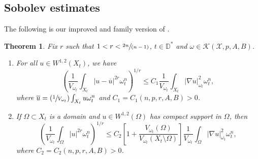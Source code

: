 \documentclass[JEP,XML,SOM,Unicode,published]{cedram}
\newcommand{\Psfrac}[2]{(\sfrac{#1}{#2})}
\newcommand{\spfrac}[2]{\sfrac{#1}{(#2)}}
\newtheorem{theorem}{Theorem}[section]
\theoremstyle{definition}
\newcommand{\D}{\mathbb D}
\begin{document}
\subsection{Sobolev estimates} \label{sec:sobolev}

The following is our improved and family version of \cite[Th.\,2.1 \& Lem.\,6.2]{GPSS23}.

\begin{theorem} \label{thm:sobolev}
Fix $r$ such that $1<r< \spfrac{2n}{n-1}$, $t \in \D^*$ and $\omega \in {\mathcal K}(\mathcal{X},p,A,B)$.
\begin{enumerate}
\item
For all $u\in W^{1,2}(X_t)$, we have
\[
\left(\frac{1}{V_{\omega_t}} \int_{X_t} |u-\overline{u}|^{2r}\omega_t^n\right)^{1/r}
\leq C_1\frac{1}{V_{\omega_t}} \int_{X_t} |\nabla u|^2_{\omega_t} \omega_t^n,
\]
where $\overline u= \Psfrac{1}{V_{\omega_t}}\int_{X_t} u \omega_t^n$ and $C_1=C_1(n,p,r,A,B)>0$.

\item
If $\Omega \subset X_t$ is a domain and $u\in W^{1,2}(\Omega)$
has compact support in $\Omega$, then
\[
\left( \frac{1}{V_{\omega_t}} \int_{\Omega} |u|^{2r}\omega_t^n \right)^{1/r}
\leq C_2 \left[1+ \frac{V_{\omega_t}(\Omega)}{V_{\omega_t}(X_t \setminus \Omega)} \right]
\frac{1}{V_{\omega_t}} \int_{\Omega} |\nabla u|^2_{\omega_t} \omega_t^n,
\]
where $C_2=C_2(n,p,r,A,B)>0$.
\end{enumerate}
\end{theorem}
\end{document}
